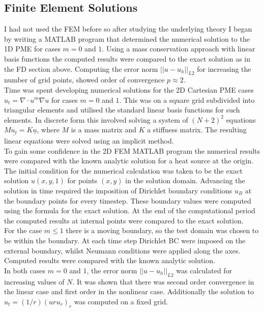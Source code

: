 \documentclass[11pt]{article}
\begin{document}
\subsection{Finite Element Solutions}
I had not used the FEM before so after studying the underlying theory I began by writing a MATLAB program that determined the numerical solution to the 1D PME for cases $m = 0 $ and $1$. Using a mass conservation approach with linear basis functions the computed results were compared to the exact solution as in the FD section above. Computing the error norm $||u-u_h||_{L2} $ for increasing the number of grid points, showed order of convergence $ p \approx 2$.\\
Time was spent developing numerical solutions for the 2D Cartesian PME cases $ u_t = \nabla\cdot{u^m}\nabla{u}$ for cases $ m = 0 $ and $1$. This was on a square grid subdivided into triangular elements and utilised the standard linear basis functions for such elements. 
In discrete form this involved solving a system of $(N+2)^2$ equations $ M\underline{u_t}=K\underline{u} $, where $M$ is a mass matrix and $K$ a stiffness matrix. The resulting linear equations were solved using an implicit method. \\
To gain some confidence in the 2D FEM MATLAB program the numerical results were compared with the known analytic solution for a heat source at the origin. The initial condition for the numerical calculation was taken to be the exact solution $u(x,y,1)$ for points $(x,y)$ in the solution domain. 
Advancing the solution in time required the imposition of Dirichlet boundary conditions $u_B$ at the boundary points for every timestep. These boundary values were computed using the formula for the exact solution. At the end of the computational period the computed results at internal points were compared to the exact solution. \\
For the case $m \leq 1$ there is a moving boundary, so the test domain was chosen to be within the boundary. At each time step Dirichlet BC were imposed on the external boundary, whilst Neumann conditions were applied along the axes. Computed results were compared with the known analytic solution.\\
In both cases $ m = 0$ and $1$, the error norm $||u-u_h||_{L2} $ was calculated for increasing values of $N$. It was shown that there was second order convergence in the linear case and first order in the nonlinear case. Additionally the solution to  $ u_t = (1/r){(uru_r )}_r    $ was computed on a fixed grid. 
\end{document}
